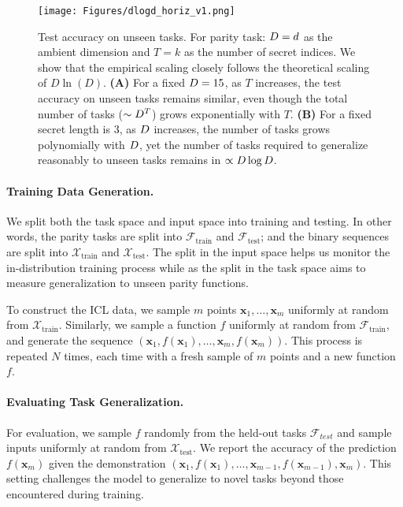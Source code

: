 \vspace{-3mm}
\begin{figure*}[ht!]
    \centering
    \texttt{[image: Figures/dlogd\_horiz\_v1.png]}
    \vspace{-4mm}
    \caption{Test accuracy on unseen tasks. For parity task: $D = d$ as the ambient dimension and $T = k$ as the number of secret indices. We show that the empirical scaling closely follows the theoretical scaling of $D \ln(D)$. \textbf{(A)} For a fixed $D = 15$, as $T$ increases, the test accuracy on unseen tasks remains similar, even though the total number of tasks ($\sim D^T$) grows exponentially with $T$.  \textbf{(B)} For a fixed secret length is $3$, as $D$ increases, the number of tasks grows polynomially with $D$, yet the number of tasks required to generalize reasonably to unseen tasks remains in $\propto D \log D$.}
    \label{fig:ood_generalization}
    \vspace{-3mm}
\end{figure*}

\paragraph{Training Data Generation.} We split both the task space and input space into training and testing. In other words, the parity tasks are split into $\mathcal{F}_{\text{train}}$ and $\mathcal{F}_{\text{test}}$; and the binary sequences are split into $\mathcal{X}_{\text{train}}$ and $\mathcal{X}_{\text{test}}$. The split in the input space helps us monitor the in-distribution training process while as the split in the task space aims to measure generalization to unseen parity functions.  




To construct the ICL data, we sample $m$ points $\bm{x}_1, \dots, \bm{x}_m$ uniformly at random from $\mathcal{X}_{\text{train}}$. Similarly, we sample a function $f$ uniformly at random from $\mathcal{F}_{\text{train}}$, and generate the sequence $(\bm{x}_1, f(\bm{x}_1), \dots, \bm{x}_m, f(\bm{x}_m))$. This process is repeated $N$ times, each time with a fresh sample of $m$ points and a new function $f$. 

\vspace{-2mm}
\paragraph{Evaluating Task Generalization.} For evaluation, we sample $f$ randomly from the held-out tasks $\mathcal{F}_{test}$ and sample inputs  uniformly at random from $\mathcal{X}_{\text{test}}$. We report the accuracy of the prediction $f(\bm{x}_m)$ given the demonstration $(\bm  x_1, f(\bm{x}_1), \dots, \bm{x}_{m-1}, f(\bm{x}_{m-1}), \bm{x}_m)$. This setting challenges the model to generalize to novel tasks beyond those encountered during training. 





